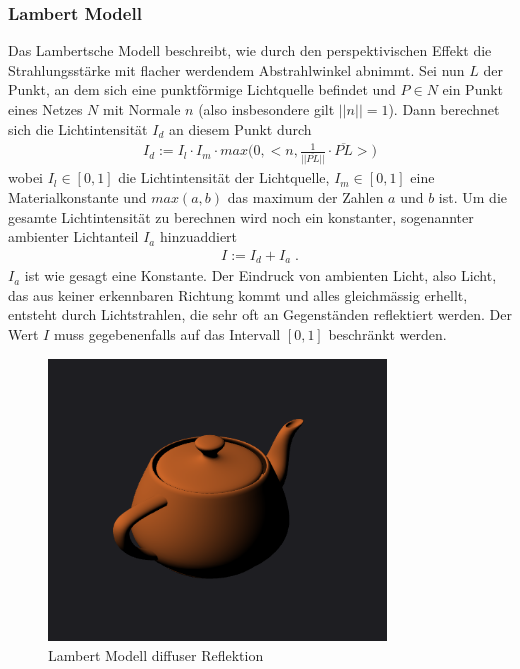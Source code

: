 \subsubsection{Lambert  Modell}
Das Lambertsche Modell beschreibt, wie durch den perspektivischen Effekt die Strahlungsstärke mit flacher werdendem Abstrahlwinkel abnimmt. Sei nun $L$ der Punkt, an dem sich eine punktförmige Lichtquelle befindet und $P \in N$ ein Punkt eines Netzes $N$ mit Normale $n$ (also insbesondere gilt $||n|| = 1$).  Dann berechnet sich die Lichtintensität $I_d$ an diesem Punkt durch
\begin{align*}
I_d :=  I_l \cdot I_m \cdot max\biggl ( 0, \biggl< n, \frac{1}{||\overline{PL}||} \cdot \overline{PL} \biggr> \biggr)
\end{align*}
wobei $I_l \in [0,1]$ die Lichtintensität der Lichtquelle, $I_m \in [0,1]$ eine Materialkonstante und $max(a,b)$ das maximum der Zahlen $a$ und $b$ ist. 
Um die gesamte Lichtintensität zu berechnen wird noch ein konstanter, sogenannter ambienter Lichtanteil $I_a$ hinzuaddiert
\begin{align}
I := I_d + I_a \;.
\end{align} 
$I_a$ ist wie gesagt eine Konstante.
 Der Eindruck von ambienten Licht, also Licht, das aus keiner erkennbaren Richtung kommt und alles gleichmässig erhellt, entsteht durch Lichtstrahlen, die sehr oft an Gegenständen reflektiert werden.
Der Wert $I$ muss gegebenenfalls auf das Intervall $[0,1]$ beschränkt werden.
\begin{figure}[H]
    \centering
    \includegraphics[width=0.8\textwidth]{images/lambert.png}
    \caption{Lambert Modell diffuser Reflektion}
    \label{fig:reflection-lambert-diffuse-model}
\end{figure}


